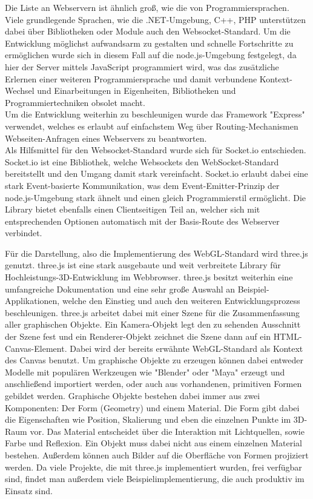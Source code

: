 Die Liste an Webservern ist ähnlich groß, wie die von Programmiersprachen. Viele grundlegende Sprachen, wie die .NET-Umgebung, C++, PHP \ua unterstützen dabei über Bibliotheken oder Module auch den Websocket-Standard. Um die Entwicklung möglichst aufwandsarm zu gestalten und schnelle Fortschritte zu ermöglichen wurde sich in diesem Fall auf die node.js-Umgebung festgelegt, da hier der Server mittels JavaScript programmiert wird, was das zusätzliche Erlernen einer weiteren Programmiersprache und damit verbundene Kontext-Wechsel und Einarbeitungen in Eigenheiten, Bibliotheken und Programmiertechniken obsolet macht.\\
Um die Entwicklung weiterhin zu beschleunigen wurde das Framework "Express" verwendet, welches es erlaubt auf einfachstem Weg über Routing-Mechanismen Webseiten-Anfragen eines Webservers zu beantworten.\\
Als Hilfsmittel für den Websocket-Standard wurde sich für Socket.io entschieden. Socket.io ist eine Bibliothek, welche Websockets den WebSocket-Standard bereitstellt und den Umgang damit stark vereinfacht. Socket.io erlaubt dabei eine stark Event-basierte Kommunikation, was dem Event-Emitter-Prinzip der node.js-Umgebung stark ähnelt und einen gleich Programmierstil ermöglicht. Die Library bietet ebenfalls einen Clientseitigen Teil an, welcher sich mit entsprechenden Optionen automatisch mit der Basis-Route des Webserver verbindet.

\noindent Für die Darstellung, also die Implementierung des WebGL-Standard wird three.js genutzt. three.js ist eine stark ausgebaute und weit verbreitete Library für Hochleistungs-3D-Entwicklung im Webbrowser. three.js besitzt weiterhin eine umfangreiche Dokumentation und eine sehr große Auswahl an Beispiel-Applikationen, welche den Einstieg und auch den weiteren Entwicklungsprozess beschleunigen. three.js arbeitet dabei mit einer Szene für die Zusammenfassung aller graphischen Objekte. Ein Kamera-Objekt legt den zu sehenden Ausschnitt der Szene fest und ein Renderer-Objekt zeichnet die Szene dann auf ein HTML-Canvas-Element. Dabei wird der bereits erwähnte WebGL-Standard als Kontext des Canvas benutzt. Um graphische Objekte zu erzeugen können dabei entweder Modelle mit populären Werkzeugen wie "Blender" oder "Maya" erzeugt und anschließend importiert werden, oder auch aus vorhandenen, primitiven Formen gebildet werden. Graphische Objekte bestehen dabei immer aus zwei Komponenten: Der Form (Geometry) und einem Material. Die Form gibt dabei die Eigenschaften wie Position, Skalierung und eben die einzelnen Punkte im 3D-Raum vor. Das Material entscheidet über die Interaktion mit Lichtquellen, sowie Farbe und Reflexion. Ein Objekt muss dabei nicht aus einem einzelnen Material bestehen. Außerdem können auch Bilder auf die Oberfläche von Formen projiziert werden. Da viele Projekte, die mit three.js implementiert wurden, frei verfügbar sind, findet man außerdem viele Beispielimplementierung, die auch produktiv im Einsatz sind.

